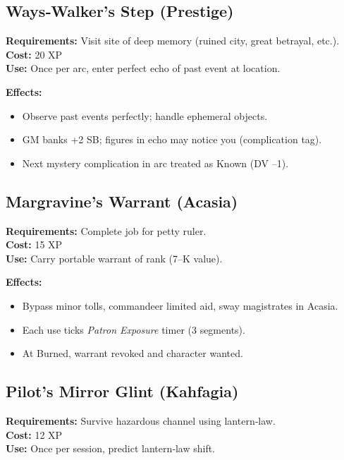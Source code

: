 \subsection{Ways‑Walker's Step (Prestige)}\label{subsec:ways_walker}

\textbf{Requirements:} Visit site of deep memory (ruined city, great betrayal, etc.).\\
\textbf{Cost:} 20 XP\\
\textbf{Use:} Once per arc, enter perfect echo of past event at location.

\textbf{Effects:}
\begin{itemize}
    \item Observe past events perfectly; handle ephemeral objects.
    \item GM banks +2 SB; figures in echo may notice you (complication tag).
    \item Next mystery complication in arc treated as Known (DV --1).
\end{itemize}

\subsection{Margravine's Warrant (Acasia)}\label{subsec:margravine_warrant}

\textbf{Requirements:} Complete job for petty ruler.\\
\textbf{Cost:} 15 XP\\
\textbf{Use:} Carry portable warrant of rank (7--K value).

\textbf{Effects:}
\begin{itemize}
    \item Bypass minor tolls, commandeer limited aid, sway magistrates in Acasia.
    \item Each use ticks \emph{Patron Exposure} timer (3 segments).
    \item At Burned, warrant revoked and character wanted.
\end{itemize}

\subsection{Pilot's Mirror Glint (Kahfagia)}\label{subsec:pilot_mirror}

\textbf{Requirements:} Survive hazardous channel using lantern‑law.\\
\textbf{Cost:} 12 XP\\
\textbf{Use:} Once per session, predict lantern‑law shift.

